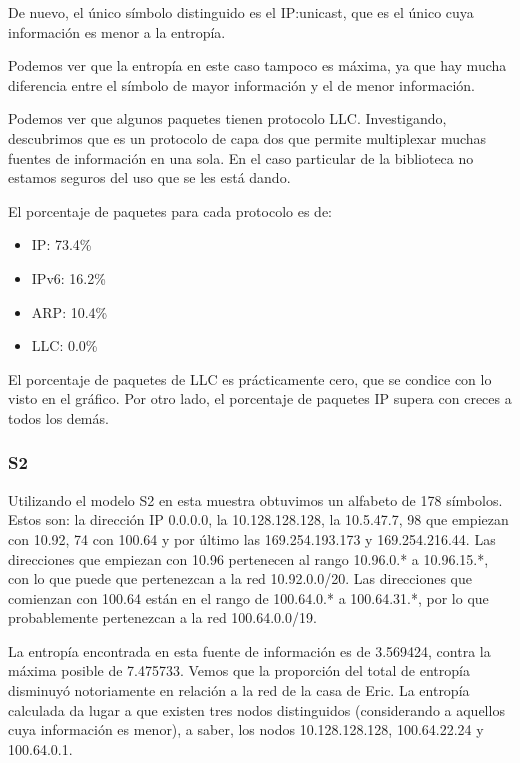 
De nuevo, el único símbolo distinguido es el IP:unicast, que es el único cuya
información es menor a la entropía.

Podemos ver que la entropía en este caso tampoco es máxima, ya que hay mucha 
diferencia entre el símbolo de mayor información y el de menor información.

Podemos ver que algunos paquetes tienen protocolo LLC. Investigando, descubrimos
que es un protocolo de capa dos que permite multiplexar muchas fuentes de
información en una sola. En el caso particular de la biblioteca no
estamos seguros del uso que se les está dando.

El porcentaje de paquetes para cada protocolo es de:
\begin{itemize}
	\item IP: 73.4\%
	\item IPv6: 16.2\%
	\item ARP: 10.4\%
	\item LLC: 0.0\%
\end{itemize}

El porcentaje de paquetes de LLC es prácticamente cero, que se condice con lo
visto en el gráfico. Por otro lado, el porcentaje de paquetes IP supera con
creces a todos los demás.

\subsubsection{S2}

Utilizando el modelo S2 en esta muestra obtuvimos un
alfabeto de 178 símbolos. Estos son: la dirección IP 0.0.0.0, la 10.128.128.128,
la 10.5.47.7, 98 que empiezan con 10.92, 74 con 100.64 y por último
las 169.254.193.173 y 169.254.216.44. Las direcciones que empiezan con
10.96 pertenecen al rango 10.96.0.* a 10.96.15.*, con lo
que puede que pertenezcan a la red 10.92.0.0/20. Las direcciones que comienzan
con 100.64 están en el rango de 100.64.0.* a 100.64.31.*, por lo que
probablemente pertenezcan a la red 100.64.0.0/19.

La entropía encontrada en esta fuente de información es de 3.569424,
contra la máxima posible de 7.475733. Vemos que la proporción del
total de entropía disminuyó notoriamente en relación a la red de la 
casa de Eric.
La entropía calculada da lugar a que existen tres nodos distinguidos (considerando a
aquellos cuya información es menor), a saber, los nodos
10.128.128.128, 100.64.22.24 y 100.64.0.1.

